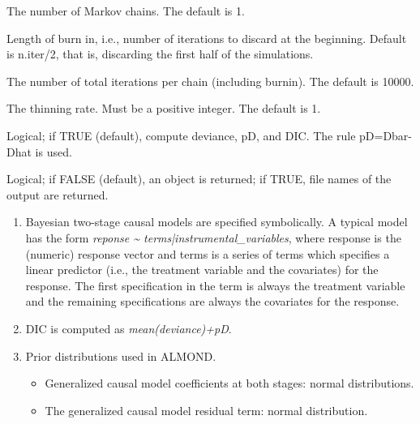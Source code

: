\documentclass[a4paper]{book}
\begin{document}
\begin{Arguments}
\begin{ldescription}
\item[\code{n.chains}] The number of Markov chains. The default is 1.

\item[\code{n.burnin}] Length of burn in, i.e., number of iterations to discard at the beginning.
Default is n.iter/2, that is, discarding the first half of the simulations.

\item[\code{n.iter}] The number of total iterations per chain (including burnin). The default is 10000.

\item[\code{n.thin}] The thinning rate. Must be a positive integer. The default is 1.

\item[\code{DIC}] Logical; if TRUE (default), compute deviance, pD, and DIC. The rule pD=Dbar-Dhat is used.

\item[\code{codaPkg}] Logical; if FALSE (default), an object is returned; if TRUE,
file names of the output are returned.
\end{ldescription}
\end{Arguments}
%
\begin{Details}\relax
\begin{enumerate}

\item Bayesian two-stage causal models are specified symbolically.
A typical model has the form \emph{reponse \textasciitilde{} terms|instrumental\_variables},
where response is the (numeric) response vector and terms is a series of terms
which specifies a linear predictor (i.e., the treatment variable and the covariates) for the response.
The first specification in the term is always the treatment variable and
the remaining specifications are always the covariates for the response.
\item DIC is computed as \emph{mean(deviance)+pD}.
\item Prior distributions used in ALMOND.
\begin{itemize}

\item Generalized causal model coefficients at both stages: normal distributions.
\item The generalized causal model residual term: normal distribution.

\end{itemize}


\end{enumerate}

\end{Details}
\end{document}
